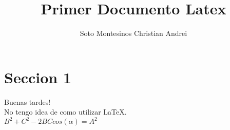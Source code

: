 \documentclass[a4paper,10pt]{article}
\title{Primer Documento Latex} %
\author{Soto Montesinos Christian Andrei} %
\begin{document}
\maketitle

% 

\section{Seccion 1}

Buenas tardes! \\ %

No tengo idea de como utilizar \LaTeX.\\ %

$B^2 + C^2- 2BC cos(\alpha)=A^2$
\end{document}
